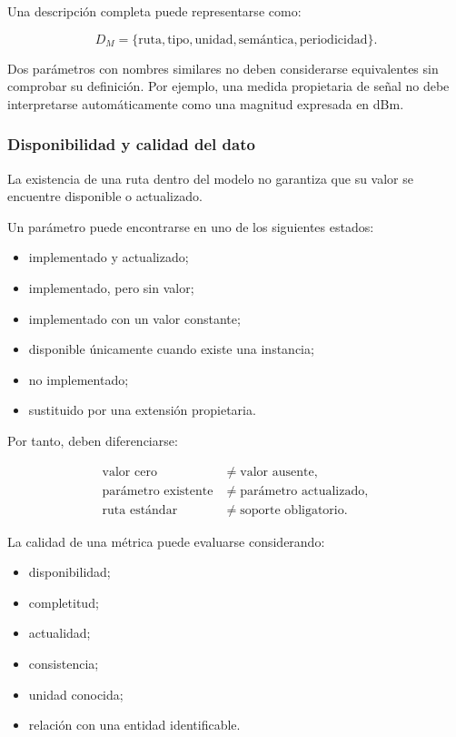 Una descripción completa puede representarse como:

\[
    D_M =
    \{
        \text{ruta},
        \text{tipo},
        \text{unidad},
        \text{semántica},
        \text{periodicidad}
    \}.
\]

Dos parámetros con nombres similares no deben considerarse equivalentes
sin comprobar su definición. Por ejemplo, una medida propietaria de
señal no debe interpretarse automáticamente como una magnitud expresada
en dBm.


\subsubsection*{Disponibilidad y calidad del dato}

La existencia de una ruta dentro del modelo no garantiza que su valor se
encuentre disponible o actualizado.

Un parámetro puede encontrarse en uno de los siguientes estados:

\begin{itemize}
    \item implementado y actualizado;

    \item implementado, pero sin valor;

    \item implementado con un valor constante;

    \item disponible únicamente cuando existe una instancia;

    \item no implementado;

    \item sustituido por una extensión propietaria.
\end{itemize}

Por tanto, deben diferenciarse:

\[
\begin{aligned}
    \text{valor cero}
    &\neq
    \text{valor ausente},\\
    \text{parámetro existente}
    &\neq
    \text{parámetro actualizado},\\
    \text{ruta estándar}
    &\neq
    \text{soporte obligatorio}.
\end{aligned}
\]

La calidad de una métrica puede evaluarse considerando:

\begin{itemize}
    \item disponibilidad;

    \item completitud;

    \item actualidad;

    \item consistencia;

    \item unidad conocida;

    \item relación con una entidad identificable.
\end{itemize}


